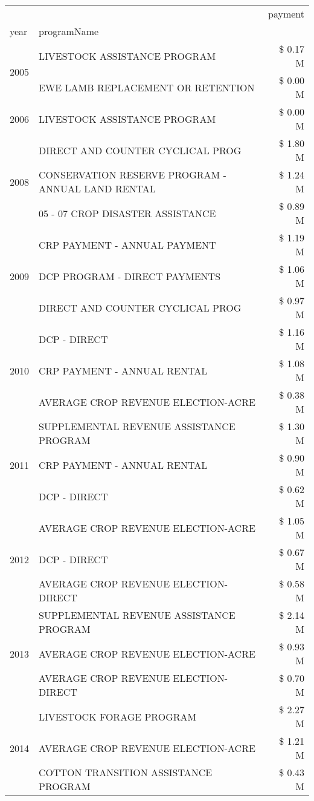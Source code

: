 \begin{tabular}{llr}
\toprule
 &  & payment \\
year & programName &  \\
\midrule
\multirow[t]{2}{*}{2005} & LIVESTOCK ASSISTANCE PROGRAM & \$ 0.17 M \\
 & EWE LAMB REPLACEMENT OR RETENTION & \$ 0.00 M \\
\cline{1-3}
2006 & LIVESTOCK ASSISTANCE PROGRAM & \$ 0.00 M \\
\cline{1-3}
\multirow[t]{3}{*}{2008} & DIRECT AND COUNTER CYCLICAL PROG & \$ 1.80 M \\
 & CONSERVATION RESERVE PROGRAM - ANNUAL LAND RENTAL & \$ 1.24 M \\
 & 05 - 07 CROP DISASTER ASSISTANCE & \$ 0.89 M \\
\cline{1-3}
\multirow[t]{3}{*}{2009} & CRP PAYMENT - ANNUAL PAYMENT & \$ 1.19 M \\
 & DCP PROGRAM - DIRECT PAYMENTS & \$ 1.06 M \\
 & DIRECT AND COUNTER CYCLICAL PROG & \$ 0.97 M \\
\cline{1-3}
\multirow[t]{3}{*}{2010} & DCP - DIRECT & \$ 1.16 M \\
 & CRP PAYMENT - ANNUAL RENTAL & \$ 1.08 M \\
 & AVERAGE CROP REVENUE ELECTION-ACRE & \$ 0.38 M \\
\cline{1-3}
\multirow[t]{3}{*}{2011} & SUPPLEMENTAL REVENUE ASSISTANCE PROGRAM & \$ 1.30 M \\
 & CRP PAYMENT - ANNUAL RENTAL & \$ 0.90 M \\
 & DCP - DIRECT & \$ 0.62 M \\
\cline{1-3}
\multirow[t]{3}{*}{2012} & AVERAGE CROP REVENUE ELECTION-ACRE & \$ 1.05 M \\
 & DCP - DIRECT & \$ 0.67 M \\
 & AVERAGE CROP REVENUE ELECTION-DIRECT & \$ 0.58 M \\
\cline{1-3}
\multirow[t]{3}{*}{2013} & SUPPLEMENTAL REVENUE ASSISTANCE PROGRAM & \$ 2.14 M \\
 & AVERAGE CROP REVENUE ELECTION-ACRE & \$ 0.93 M \\
 & AVERAGE CROP REVENUE ELECTION-DIRECT & \$ 0.70 M \\
\cline{1-3}
\multirow[t]{3}{*}{2014} & LIVESTOCK FORAGE PROGRAM & \$ 2.27 M \\
 & AVERAGE CROP REVENUE ELECTION-ACRE & \$ 1.21 M \\
 & COTTON TRANSITION ASSISTANCE PROGRAM & \$ 0.43 M \\

\end{tabular}
